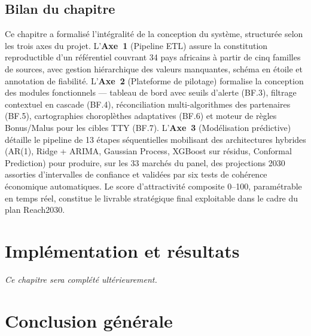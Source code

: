 \documentclass[12pt,a4paper]{report}
\begin{document}
\section{Bilan du chapitre}

Ce chapitre a formalisé l'intégralité de la conception du système, structurée selon les trois axes du projet. L'\textbf{Axe~1} (Pipeline ETL) assure la constitution reproductible d'un référentiel couvrant 34 pays africains à partir de cinq familles de sources, avec gestion hiérarchique des valeurs manquantes, schéma en étoile et annotation de fiabilité. L'\textbf{Axe~2} (Plateforme de pilotage) formalise la conception des modules fonctionnels --- tableau de bord avec seuils d'alerte (BF.3), filtrage contextuel en cascade (BF.4), réconciliation multi-algorithmes des partenaires (BF.5), cartographies choroplèthes adaptatives (BF.6) et moteur de règles Bonus/Malus pour les cibles TTY (BF.7). L'\textbf{Axe~3} (Modélisation prédictive) détaille le pipeline de 13 étapes séquentielles mobilisant des architectures hybrides (AR(1), Ridge + ARIMA, Gaussian Process, XGBoost sur résidus, Conformal Prediction) pour produire, sur les 33 marchés du panel, des projections 2030 assorties d'intervalles de confiance et validées par six tests de cohérence économique automatiques. Le score d'attractivité composite 0--100, paramétrable en temps réel, constitue le livrable stratégique final exploitable dans le cadre du plan Reach2030.

\clearpage

\chapter{Implémentation et résultats}
\label{chap:implementation}

\vspace{2cm}
\begin{center}
\textit{Ce chapitre sera complété ultérieurement.}
\end{center}

\clearpage

\chapter*{Conclusion générale}
\end{document}
